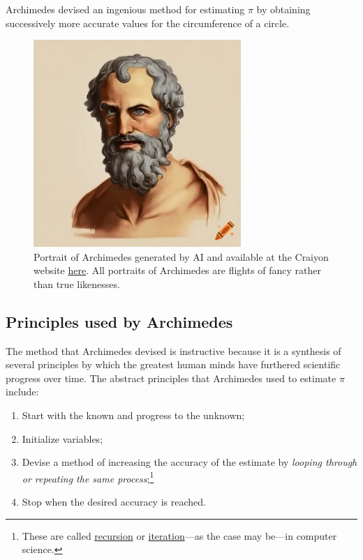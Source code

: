 \documentclass[
  a4paper,
]{article}
\begin{document}
Archimedes devised an ingenious method for estimating \(\pi\) by
obtaining successively more accurate values for the circumference of a
circle.

\begin{figure}
\centering
\includegraphics[width=0.7\textwidth,height=\textheight]{images/Archimedes-AI-generated-portrait.png}
\caption{Portrait of Archimedes generated by AI and available at the
Craiyon website
\href{https://www.craiyon.com/image/JEmP4rPCRW25xyCULOeMSw}{here}. All
portraits of Archimedes are flights of fancy rather than true
likenesses.}\label{fig:Archimedes-AI}
\end{figure}

\subsection{Principles used by
Archimedes}\label{principles-used-by-archimedes}

The method that Archimedes devised is instructive because it is a
synthesis of several principles by which the greatest human minds have
furthered scientific progress over time. The abstract principles that
Archimedes used to estimate \(\pi\) include:

\begin{enumerate}
\item
  Start with the known and progress to the unknown;
\item
  Initialize variables;
\item
  Devise a method of increasing the accuracy of the estimate by
  \emph{looping through or repeating the same process};\footnote{These
    are called
    \href{https://mathworld.wolfram.com/Recursion.html}{recursion} or
    \href{https://www.vocabulary.com/dictionary/iteration}{iteration}---as
    the case may be---in computer science.}
\item
  Stop when the desired accuracy is reached.
\end{enumerate}
\end{document}
